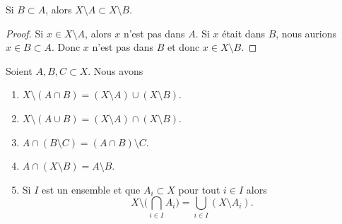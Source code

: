 \begin{lemma}	\label{LEMooIJAMooDQfGtM}
	Si \( B\subset A\), alors \( X\setminus A\subset X\setminus B\).
\end{lemma}

\begin{proof}
	Si \( x\in X\setminus A\), alors \( x\) n'est pas dans \( A\). Si \( x\) était dans \( B\), nous aurions \( x\in B\subset A\). Donc \( x\) n'est pas dans \( B\) et donc \( x\in X\setminus B\).
\end{proof}

\begin{lemma}       \label{LEMooHRKAooRskzQL}
	Soient \( A,B,C\subset X\). Nous avons
	\begin{enumerate}
		\item	\label{ITEMooIXUAooXDPtWj}
		      \( X\setminus (A\cap B)=(X\setminus A)\cup(X\setminus B)\).
		\item       \label{ITEMooQCGUooKnWfBo}
		      \( X\setminus (A\cup B)=(X\setminus A)\cap(X\setminus B)\).
		\item       \label{ITEMooXWKCooUASxlh}
		      \( A\cap(B\setminus C)=(A\cap B)\setminus C\).
		\item		\label{ITEMooRXJOooUYPaCp}
		      \( A\cap(X\setminus B)=A\setminus B\).
		\item		\label{ITEMooYYWAooLnADjR}
		      Si \( I\) est un ensemble et que \( A_i\subset X\) pour tout \( i\in I\) alors
		      \begin{equation}
			      X\setminus\big( \bigcap_{i\in I}A_i \big)=\bigcup_{i\in I}(X\setminus A_i).
		      \end{equation}
	\end{enumerate}
\end{lemma}

